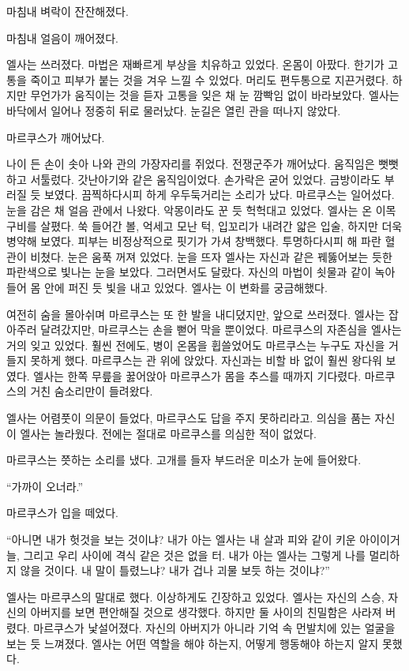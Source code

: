 마침내 벼락이 잔잔해졌다.

마침내 얼음이 깨어졌다.

엘사는 쓰러졌다. 마법은 재빠르게 부상을 치유하고 있었다. 온몸이 아팠다. 한기가 고통을 죽이고 피부가 붙는 것을 겨우 느낄 수 있었다. 머리도 편두통으로 지끈거렸다. 하지만 무언가가 움직이는 것을 듣자 고통을 잊은 채 눈 깜빡임 없이 바라보았다. 엘사는 바닥에서 일어나 정중히 뒤로 물러났다. 눈길은 열린 관을 떠나지 않았다.

마르쿠스가 깨어났다.

나이 든 손이 솟아 나와 관의 가장자리를 쥐었다. 전쟁군주가 깨어났다. 움직임은 뻣뻣하고 서툴렀다. 갓난아기와 같은 움직임이었다. 손가락은 굳어 있었다. 금방이라도 부러질 듯 보였다. 끔찍하다시피 하게 우두둑거리는 소리가 났다. 마르쿠스는 일어섰다. 눈을 감은 채 얼음 관에서 나왔다. 악몽이라도 꾼 듯 헉헉대고 있었다. 엘사는 온 이목구비를 살폈다. 쑥 들어간 볼, 억세고 모난 턱, 입꼬리가 내려간 얇은 입술, 하지만 더욱 병약해 보였다. 피부는 비정상적으로 핏기가 가셔 창백했다. 투명하다시피 해 파란 혈관이 비쳤다. 눈은 움푹 꺼져 있었다. 눈을 뜨자 엘사는 자신과 같은 꿰뚫어보는 듯한 파란색으로 빛나는 눈을 보았다. 그러면서도 달랐다. 자신의 마법이 쇳물과 같이 녹아들어 몸 안에 퍼진 듯 빛을 내고 있었다. 엘사는 이 변화를 궁금해했다.

여전히 숨을 몰아쉬며 마르쿠스는 또 한 발을 내디뎠지만, 앞으로 쓰러졌다. 엘사는 잡아주러 달려갔지만, 마르쿠스는 손을 뻗어 막을 뿐이었다. 마르쿠스의 자존심을 엘사는 거의 잊고 있었다. 훨씬 전에도, 병이 온몸을 휩쓸었어도 마르쿠스는 누구도 자신을 거들지 못하게 했다. 마르쿠스는 관 위에 앉았다. 자신과는 비할 바 없이 훨씬 왕다워 보였다. 엘사는 한쪽 무릎을 꿇어앉아 마르쿠스가 몸을 추스를 때까지 기다렸다. 마르쿠스의 거친 숨소리만이 들려왔다.

엘사는 어렴풋이 의문이 들었다, 마르쿠스도 답을 주지 못하리라고. 의심을 품는 자신이 엘사는 놀라웠다. 전에는 절대로 마르쿠스를 의심한 적이 없었다.

마르쿠스는 쯧하는 소리를 냈다. 고개를 들자 부드러운 미소가 눈에 들어왔다.

``가까이 오너라.''

마르쿠스가 입을 떼었다.

``아니면 내가 헛것을 보는 것이냐? 내가 아는 엘사는 내 살과 피와 같이 키운 아이이거늘, 그리고 우리 사이에 격식 같은 것은 없을 터. 내가 아는 엘사는 그렇게 나를 멀리하지 않을 것이다. 내 말이 틀렸느냐? 내가 겁나 괴물 보듯 하는 것이냐?''

엘사는 마르쿠스의 말대로 했다. 이상하게도 긴장하고 있었다. 엘사는 자신의 스승, 자신의 아버지를 보면 편안해질 것으로 생각했다. 하지만 둘 사이의 친밀함은 사라져 버렸다. 마르쿠스가 낯설어졌다. 자신의 아버지가 아니라 기억 속 먼발치에 있는 얼굴을 보는 듯 느껴졌다. 엘사는 어떤 역할을 해야 하는지, 어떻게 행동해야 하는지 알지 못했다.

